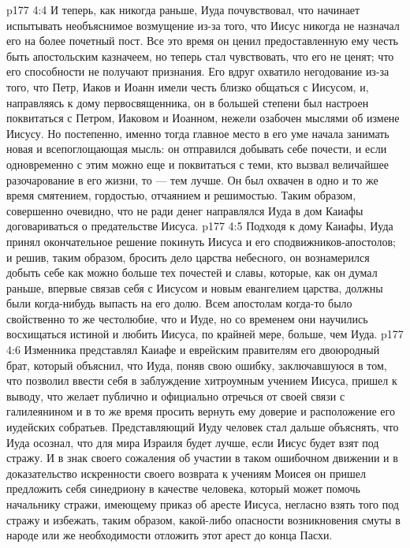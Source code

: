 \vs p177 4:4 И теперь, как никогда раньше, Иуда почувствовал, что начинает испытывать необъяснимое возмущение из\hyp{}за того, что Иисус никогда не назначал его на более почетный пост. Все это время он ценил предоставленную ему честь быть апостольским казначеем, но теперь стал чувствовать, что его не ценят; что его способности не получают признания. Его вдруг охватило негодование из\hyp{}за того, что Петр, Иаков и Иоанн имели честь близко общаться с Иисусом, и, направляясь к дому первосвященника, он в большей степени был настроен поквитаться с Петром, Иаковом и Иоанном, нежели озабочен мыслями об измене Иисусу. Но постепенно, именно тогда главное место в его уме начала занимать новая и всепоглощающая мысль: он отправился добывать себе почести, и если одновременно с этим можно еще и поквитаться с теми, кто вызвал величайшее разочарование в его жизни, то --- тем лучше. Он был охвачен в одно и то же время смятением, гордостью, отчаянием и решимостью. Таким образом, совершенно очевидно, что не ради денег направлялся Иуда в дом Каиафы договариваться о предательстве Иисуса.
\vs p177 4:5 Подходя к дому Каиафы, Иуда принял окончательное решение покинуть Иисуса и его сподвижников\hyp{}апостолов; и решив, таким образом, бросить дело царства небесного, он вознамерился добыть себе как можно больше тех почестей и славы, которые, как он думал раньше, впервые связав себя с Иисусом и новым евангелием царства, должны были когда\hyp{}нибудь выпасть на его долю. Всем апостолам когда\hyp{}то было свойственно то же честолюбие, что и Иуде, но со временем они научились восхищаться истиной и любить Иисуса, по крайней мере, больше, чем Иуда.
\vs p177 4:6 Изменника представлял Каиафе и еврейским правителям его двоюродный брат, который объяснил, что Иуда, поняв свою ошибку, заключавшуюся в том, что позволил ввести себя в заблуждение хитроумным учением Иисуса, пришел к выводу, что желает публично и официально отречься от своей связи с галилеянином и в то же время просить вернуть ему доверие и расположение его иудейских собратьев. Представляющий Иуду человек стал дальше объяснять, что Иуда осознал, что для мира Израиля будет лучше, если Иисус будет взят под стражу. И в знак своего сожаления об участии в таком ошибочном движении и в доказательство искренности своего возврата к учениям Моисея он пришел предложить себя синедриону в качестве человека, который может помочь начальнику стражи, имеющему приказ об аресте Иисуса, негласно взять того под стражу и избежать, таким образом, какой\hyp{}либо опасности возникновения смуты в народе или же необходимости отложить этот арест до конца Пасхи.
